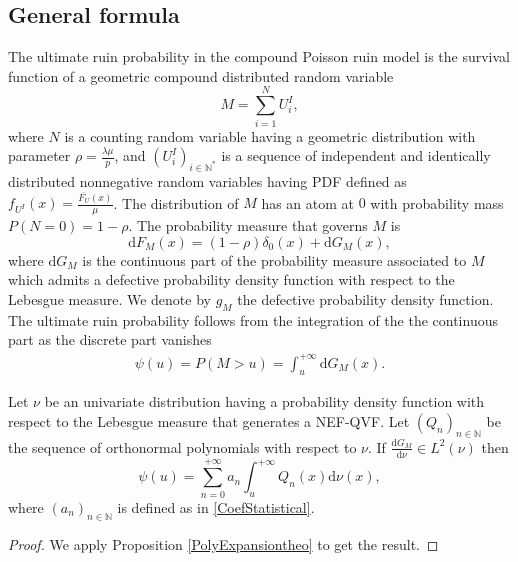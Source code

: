 \subsection{General formula}
The ultimate ruin probability in the compound Poisson ruin model is the survival function of a geometric compound distributed random variable
\begin{equation}\label{RandomVariableGeometricCompound}
M=\sum^{N}_{i=1}U_{i}^{I},
\end{equation}
where $N$ is a counting random variable having a geometric distribution with parameter $\rho=\frac{\lambda\mu}{p}$, and $(U^{I}_{i})_{i\in\mathbb{N}^{*}}$ is a sequence of independent and identically distributed nonnegative random variables having PDF defined as $f_{U^{I}}(x)=\frac{\overline{F_{U}}(x)}{\mu}$. The distribution of $M$ has an atom at $0$ with probability mass $P(N=0)=1-\rho$. The probability measure that governs $M$ is
\begin{equation}
\text{d}F_{M}(x)=\left(1-\rho\right)\delta_{0}(x)+\text{d}G_{M}(x),
\end{equation}
where $\text{d}G_{M}$ is the continuous part of the probability measure associated to $M$ which admits a defective probability density function with respect to the Lebesgue measure. We denote by $g_{M}$ the defective probability density function. The ultimate ruin probability follows from the integration of the the continuous part as the discrete part vanishes 
\begin{eqnarray*}
\psi(u)=P(M>u)=\int_{u}^{+\infty}\text{d}G_{M}(x).
\end{eqnarray*}
\begin{Theo}\label{RuinProbabilityExpansionTheo}
Let $\nu$ be an univariate distribution having a probability density function with respect to the Lebesgue measure that generates a NEF-QVF. Let $(Q_{n})_{n\in\mathbb{N}}$ be the sequence of orthonormal polynomials with respect to $\nu$. If $\frac{\text{d}G_{M}}{\text{d}\nu}\in L^{2}(\nu)$ then
\begin{equation}\label{RuinProbabilityExpansion}
\psi(u)=\sum^{+\infty}_{n=0}a_{n}\int^{+\infty}_{u}Q_{n}(x)\text{d}\nu(x),
\end{equation}
where $(a_{n})_{n\in\mathbb{N}}$ is defined as in \eqref{CoefStatistical}. 
\end{Theo}
\begin{proof}
We apply Proposition \ref{PolyExpansiontheo} to get the result.
\end{proof}
